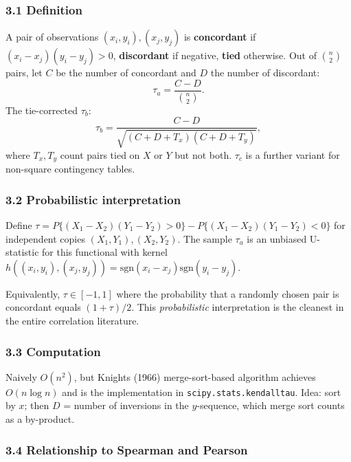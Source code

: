 \documentclass{article}
\begin{document}
\subsubsection{3.1 Definition}\label{31-definition}

A pair of observations \((x_i, y_i), (x_j, y_j)\) is \textbf{concordant}
if \((x_i - x_j)(y_i - y_j) > 0\), \textbf{discordant} if negative,
\textbf{tied} otherwise. Out of \(\binom{n}{2}\) pairs, let \(C\) be the
number of concordant and \(D\) the number of discordant: \[
\tau_a = \frac{C - D}{\binom{n}{2}}.
\] The tie-corrected \(\tau_b\): \[
\tau_b = \frac{C - D}{\sqrt{(C + D + T_x)(C + D + T_y)}},
\] where \(T_x, T_y\) count pairs tied on \(X\) or \(Y\) but not both.
\(\tau_c\) is a further variant for non-square contingency tables.

\subsubsection{3.2 Probabilistic
interpretation}\label{32-probabilistic-interpretation}

Define
\(\tau = P\{(X_1 - X_2)(Y_1 - Y_2) > 0\} - P\{(X_1 - X_2)(Y_1 - Y_2) < 0\}\)
for independent copies \((X_1, Y_1), (X_2, Y_2)\). The sample \(\tau_a\)
is an unbiased U-statistic for this functional with kernel
\(h((x_i, y_i), (x_j, y_j)) = \mathrm{sgn}(x_i - x_j) \mathrm{sgn}(y_i - y_j)\).

Equivalently, \(\tau \in [-1, 1]\) where the probability that a randomly
chosen pair is concordant equals \((1 + \tau)/2\). This
\emph{probabilistic} interpretation is the cleanest in the entire
correlation literature.

\subsubsection{3.3 Computation}\label{33-computation}

Naively \(O(n^2)\), but Knight\textquotesingle s (1966) merge-sort-based
algorithm achieves \(O(n \log n)\) and is the implementation in
\texttt{scipy.stats.kendalltau}. Idea: sort by \(x\); then \(D\) =
number of inversions in the \(y\)-sequence, which merge sort counts as a
by-product.

\subsubsection{3.4 Relationship to Spearman and
Pearson}\label{34-relationship-to-spearman-and-pearson}
\end{document}
